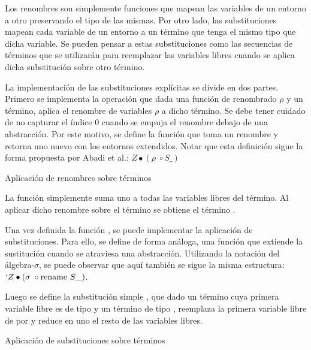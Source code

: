 
Los renombres son simplemente funciones que mapean las variables de un entorno a otro preservando el tipo de las mismas.
Por otro lado, las substituciones mapean cada variable de un entorno a un término que tenga el mismo tipo que dicha variable.
Se pueden pensar a estas substituciones como las secuencias de términos que se utilizarán para reemplazar las variables libres cuando se aplica dicha substitución sobre otro término. 

La implementación de las substituciones explícitas se divide en dos partes.
Primero se implementa la operación  que dada una función de renombrado $\rho$ y un término, aplica el renombre de variables $\rho$ a dicho término.
Se debe tener cuidado de no capturar el índice 0 cuando se empuja el renombre debajo de una abstracción.
Por este motivo, se define la función  que toma un renombre y retorna uno nuevo con los entornos extendidos.
Notar que esta definición sigue la forma propuesta por Abadi et al.: $Z \bullet (\rho \; \circ S\_)$

\begin{codigo}
	Aplicación de renombres sobre términos
\end{codigo}

\begin{example}
	La función   simplemente suma uno a todas las variables libres del término.
	Al aplicar dicho renombre sobre el término  se obtiene el término .
	
\end{example}

Una vez definida la función , se puede implementar la aplicación de substituciones.
Para ello, se define de forma análoga, una función  que extiende la sustitución cuando se atraviesa una abstracción.
Utilizando la notación del álgebra-$\sigma$, se puede observar que aquí también se sigue la misma estructura: $`Z \bullet (\sigma \; \circ \text{rename } S\_)$.

Luego se define la substitución simple \func{\_[\_]}, que dado un término  cuya primera variable libre es de tipo  y un término  de tipo , reemplaza la primera variable libre de  por  y reduce en uno el resto de las variables libres.

\begin{codigo}
	Aplicación de substituciones sobre términos
\end{codigo}

